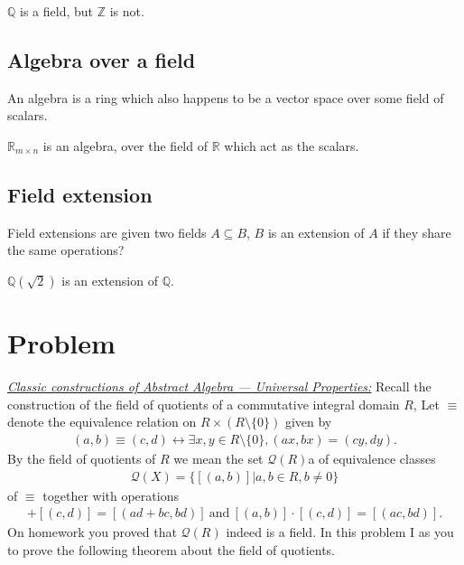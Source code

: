 \documentclass[10pt]{amsart}
\newcommand{\Z}{\mathbb{Z}}
\newcommand{\R}{\mathbb{R}}
\newcommand{\Q}{\mathbb{Q}}
\newcommand{\lra}{\longleftrightarrow}
\begin{document}
$\Q$ is a field, but $\Z$ is not.

\subsection{Algebra over a field}%
\label{sub:algebra_over_a_field}

An algebra is a ring which also happens to be a vector space over some field of
scalars.

$\R_{m\times n}$ is an algebra, over the field of $\R$ which act as the
scalars.

\subsection{Field extension}%
\label{sub:field_extension}

Field extensions are given two fields $A\subseteq B$, $B$ is an extension of
$A$ if they share the same operations?

$\Q(\sqrt{2})$ is an extension of $\Q$.

\section{Problem}%
\label{sec:problem_2}

\underline{\textit{Classic constructions of Abstract Algebra --- Universal
    Properties:}} Recall the construction of the field of quotients of a
commutative integral domain $R$, Let $\equiv$ denote the equivalence relation
on $R\times(R\setminus\{0\})$ given by
\begin{align*}
  (a,b)\equiv(c,d)\lra\exists x,y\in R\setminus\{0\},(ax,bx)=(cy,dy).
\end{align*}
By the field of quotients of $R$ we mean the set $\mathcal{Q}(R)$a of
equivalence classes
\begin{align*}
  \mathcal{Q}(X)=\{[(a,b)]\vert a,b\in R,b\neq 0\}
\end{align*}
of $\equiv$ together with operations
\begin{align*}
  [(a,b)]+[(c,d)]=[(ad+bc,bd)]\ \text{and}\ [(a,b)]\cdot[(c,d)]=[(ac,bd)].
\end{align*}
On homework you proved that $\mathcal{Q}(R)$ indeed is a field. In this problem
I as you to prove the following theorem about the field of quotients.

\subsection{}%
\label{sub:2a}
\end{document}

